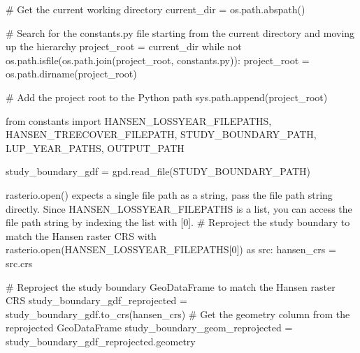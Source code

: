 \documentclass[
  letterpaper,
  DIV=11,
  numbers=noendperiod]{scrartcl}
\newenvironment{Shaded}{\begin{snugshade}}{\end{snugshade}}
\newcommand{\BuiltInTok}[1]{\textcolor[rgb]{0.00,0.23,0.31}{#1}}
\newcommand{\CommentTok}[1]{\textcolor[rgb]{0.37,0.37,0.37}{#1}}
\newcommand{\ControlFlowTok}[1]{\textcolor[rgb]{0.00,0.23,0.31}{#1}}
\newcommand{\DecValTok}[1]{\textcolor[rgb]{0.68,0.00,0.00}{#1}}
\newcommand{\ImportTok}[1]{\textcolor[rgb]{0.00,0.46,0.62}{#1}}
\newcommand{\KeywordTok}[1]{\textcolor[rgb]{0.00,0.23,0.31}{#1}}
\newcommand{\NormalTok}[1]{\textcolor[rgb]{0.00,0.23,0.31}{#1}}
\newcommand{\OperatorTok}[1]{\textcolor[rgb]{0.37,0.37,0.37}{#1}}
\newcommand{\StringTok}[1]{\textcolor[rgb]{0.13,0.47,0.30}{#1}}
\begin{document}
\begin{Shaded}
\begin{Highlighting}[]

\CommentTok{\# Get the current working directory}
\NormalTok{current\_dir }\OperatorTok{=}\NormalTok{ os.path.abspath(}\StringTok{\textquotesingle{}\textquotesingle{}}\NormalTok{)}

\CommentTok{\# Search for the \textquotesingle{}constants.py\textquotesingle{} file starting from the current directory and moving up the hierarchy}
\NormalTok{project\_root }\OperatorTok{=}\NormalTok{ current\_dir}
\ControlFlowTok{while} \KeywordTok{not}\NormalTok{ os.path.isfile(os.path.join(project\_root, }\StringTok{\textquotesingle{}constants.py\textquotesingle{}}\NormalTok{)):}
\NormalTok{    project\_root }\OperatorTok{=}\NormalTok{ os.path.dirname(project\_root)}

\CommentTok{\# Add the project root to the Python path}
\NormalTok{sys.path.append(project\_root)}
\end{Highlighting}
\end{Shaded}

\begin{Shaded}
\begin{Highlighting}[]
\ImportTok{from}\NormalTok{ constants }\ImportTok{import}\NormalTok{ HANSEN\_LOSSYEAR\_FILEPATHS, HANSEN\_TREECOVER\_FILEPATH, STUDY\_BOUNDARY\_PATH, LUP\_YEAR\_PATHS, OUTPUT\_PATH}
\end{Highlighting}
\end{Shaded}

\begin{Shaded}
\begin{Highlighting}[]
\NormalTok{study\_boundary\_gdf }\OperatorTok{=}\NormalTok{ gpd.read\_file(STUDY\_BOUNDARY\_PATH)}

\CommentTok{\textquotesingle{}\textquotesingle{}\textquotesingle{}rasterio.open() expects a single file path as a string, }
\CommentTok{ pass the file path string directly. Since HANSEN\_LOSSYEAR\_FILEPATHS is a list, }
\CommentTok{ you can access the file path string by indexing the list with [0].}
\CommentTok{ \textquotesingle{}\textquotesingle{}\textquotesingle{}}
\CommentTok{\# Reproject the study boundary to match the Hansen raster CRS}
\ControlFlowTok{with}\NormalTok{ rasterio.}\BuiltInTok{open}\NormalTok{(HANSEN\_LOSSYEAR\_FILEPATHS[}\DecValTok{0}\NormalTok{]) }\ImportTok{as}\NormalTok{ src:}
\NormalTok{    hansen\_crs }\OperatorTok{=}\NormalTok{ src.crs}

\CommentTok{\# Reproject the study boundary GeoDataFrame to match the Hansen raster CRS    }
\NormalTok{study\_boundary\_gdf\_reprojected }\OperatorTok{=}\NormalTok{ study\_boundary\_gdf.to\_crs(hansen\_crs)}
\CommentTok{\# Get the geometry column from the reprojected GeoDataFrame}
\NormalTok{study\_boundary\_geom\_reprojected }\OperatorTok{=}\NormalTok{ study\_boundary\_gdf\_reprojected.geometry}
\end{Highlighting}
\end{Shaded}
\end{document}
